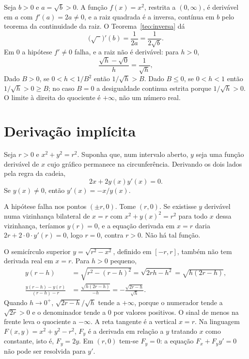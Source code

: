 \documentclass[11pt,a4paper]{article}
\begin{document}
\begin{exemplo}
\label{ex:raiz-der}
Seja $b>0$ e $a=\sqrt{b}>0$. A fun\c{c}\~ao $f(x)=x^2$, restrita a $(0,\infty)$, \'e deriv\'avel em $a$ com $f'(a)=2a\neq 0$, e a raiz quadrada \'e a inversa, cont\'inua em $b$ pelo teorema da continuidade da raiz. O Teorema~\ref{teo:inversa} d\'a
\[
\bigl(\sqrt{\phantom{x}}\bigr)'(b)=\frac{1}{2a}=\frac{1}{2\sqrt{b}}.
\]
Em $0$ a hip\'otese $f'\neq 0$ falha, e a raiz n\~ao \'e deriv\'avel: para $h>0$,
\[
\frac{\sqrt{h}-\sqrt{0}}{h}=\frac{1}{\sqrt{h}},
\]
Dado $B>0$, se $0<h<1/B^2$ ent\~ao $1/\sqrt{h}>B$. Dado $B\le 0$, se $0<h<1$ ent\~ao $1/\sqrt{h}>0\ge B$; no caso $B=0$ a desigualdade continua estrita porque $1/\sqrt{h}>0$. O limite \`a direita do quociente \'e $+\infty$, n\~ao um n\'umero real.
\end{exemplo}

\section{Deriva\c{c}\~ao impl\'icita}
\label{sec:implicita}

\begin{exemplo}
\label{ex:circulo}
Seja $r>0$ e $x^2+y^2=r^2$. Suponha que, num intervalo aberto, $y$ seja uma fun\c{c}\~ao deriv\'avel de $x$ cujo gr\'afico permanece na circunfer\^encia. Derivando os dois lados pela regra da cadeia,
\[
2x+2y(x)y'(x)=0.
\]
Se $y(x)\neq 0$, ent\~ao $y'(x)=-x/y(x)$.

A hip\'otese falha nos pontos $(\pm r,0)$. Tome $(r,0)$. Se existisse $y$ deriv\'avel numa vizinhan\c{c}a bilateral de $x=r$ com $x^2+y(x)^2=r^2$ para todo $x$ dessa vizinhan\c{c}a, ter\'iamos $y(r)=0$, e a equa\c{c}\~ao derivada em $x=r$ daria $2r+2\cdot 0\cdot y'(r)=0$, logo $r=0$, contra $r>0$. N\~ao h\'a tal fun\c{c}\~ao.

O semic\'irculo superior $y=\sqrt{r^2-x^2}$, definido em $[-r,r]$, tamb\'em n\~ao tem derivada real em $x=r$. Para $h>0$ pequeno,
\begin{align*}
y(r-h)&=\sqrt{r^2-(r-h)^2}=\sqrt{2rh-h^2}=\sqrt{h(2r-h)},\\
\frac{y(r-h)-y(r)}{(r-h)-r}&=\frac{\sqrt{h(2r-h)}}{-h}=-\frac{\sqrt{2r-h}}{\sqrt{h}}.
\end{align*}
Quando $h\to 0^+$, $\sqrt{2r-h}/\sqrt{h}$ tende a $+\infty$, porque o numerador tende a $\sqrt{2r}>0$ e o denominador tende a $0$ por valores positivos. O sinal de menos na frente leva o quociente a $-\infty$. A reta tangente \'e a vertical $x=r$. Na linguagem $F(x,y)=x^2+y^2-r^2$, $F_y$ \'e a derivada em rela\c{c}\~ao a $y$ tratando $x$ como constante, isto \'e, $F_y=2y$. Em $(r,0)$ tem-se $F_y=0$: a equa\c{c}\~ao $F_x+F_y y'=0$ n\~ao pode ser resolvida para $y'$.
\end{exemplo}
\end{document}
